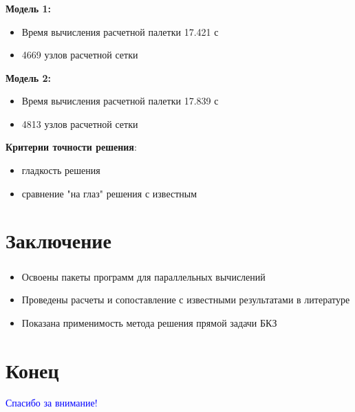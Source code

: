 \begin{frame}
\frametitle{\insertsection}

\textbf{Модель 1:}
\begin{itemize}
    \item Время вычисления расчетной палетки 17.421 с
    \item 4669 узлов расчетной сетки
\end{itemize}
\bigskip

\textbf{Модель 2:}
\begin{itemize}
    \item Время вычисления расчетной палетки 17.839 с
    \item 4813 узлов расчетной сетки
\end{itemize}
\bigskip

\textbf{Критерии точности решения}:
\begin{itemize}
    \item гладкость решения
    \item сравнение "на глаз" решения с известным
\end{itemize}
\end{frame}


\section{Заключение}

\begin{frame}
\frametitle{\insertsection}

\begin{itemize}
    \item Освоены пакеты программ для параллельных вычислений
    \item Проведены расчеты и сопоставление с известными результатами в литературе
    \item Показана применимость метода решения прямой задачи БКЗ
\end{itemize}
\end{frame}


\section{Конец}

\begin{frame}
\centering
\vfill
\textcolor{Blue}{\Large Спасибо за внимание!}
\vfill
\end{frame}